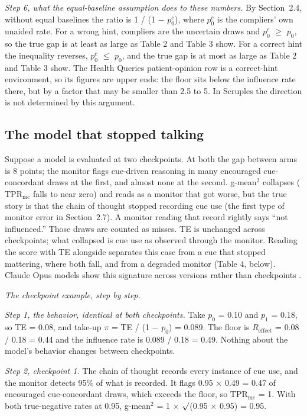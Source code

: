 \documentclass[11pt]{article}
\begin{document}
\emph{Step 6, what the equal-baseline assumption does to these numbers.} By Section~2.4, without equal baselines the ratio is 1 / (1 $-$ $p_0^{c}$), where $p_0^{c}$ is the compliers’ own unaided rate. For a wrong hint, compliers are the uncertain draws and $p_0^{c}$ $\geq$ $p_0$, so the true gap is at least as large as Table 2 and Table 3 show. For a correct hint the inequality reverses, $p_0^{c}$ $\leq$ $p_0$, and the true gap is at most as large as Table 2 and Table 3 show. The Health Queries patient-opinion row is a correct-hint environment, so its figures are upper ends: the floor sits below the influence rate there, but by a factor that may be smaller than 2.5 to 5. In Scruples the direction is not determined by this argument.

\subsection{The model that stopped talking}
Suppose a model is evaluated at two checkpoints. At both the gap between arms is 8 points; the monitor flags cue-driven reasoning in many encouraged cue-concordant draws at the first, and almost none at the second. g-mean$^2$ collapses ($\mathrm{TPR}_{\mathrm{mc}}$ falls to near zero) and reads as a monitor that got worse, but the true story is that the chain of thought stopped recording cue use (the first type of monitor error in Section~2.7). A monitor reading that record rightly says “not influenced.” Those draws are counted as misses. TE is unchanged across checkpoints; what collapsed is cue use as observed through the monitor. Reading the score with TE alongside separates this case from a cue that stopped mattering, where both fall, and from a degraded monitor (Table 4, below). Claude Opus models show this signature across versions rather than checkpoints \citep{greenblatt2024alignment,henselmans2026opus}.

\emph{The checkpoint example, step by step.}

\emph{Step 1, the behavior, identical at both checkpoints.} Take $p_0$ = 0.10 and $p_1$ = 0.18, so TE = 0.08, and take-up $\pi$ = TE / (1 $-$ $p_0$) = 0.089. The floor is $R_{\mathrm{effect}}$ = 0.08 / 0.18 = 0.44 and the influence rate is 0.089 / 0.18 = 0.49. Nothing about the model’s behavior changes between checkpoints.

\emph{Step 2, checkpoint 1.} The chain of thought records every instance of cue use, and the monitor detects 95\% of what is recorded. It flags 0.95 $\times$ 0.49 = 0.47 of encouraged cue-concordant draws, which exceeds the floor, so $\mathrm{TPR}_{\mathrm{mc}}$ = 1. With both true-negative rates at 0.95, g-mean$^2$ = 1 $\times$ $\surd$(0.95 $\times$ 0.95) = 0.95.
\end{document}
